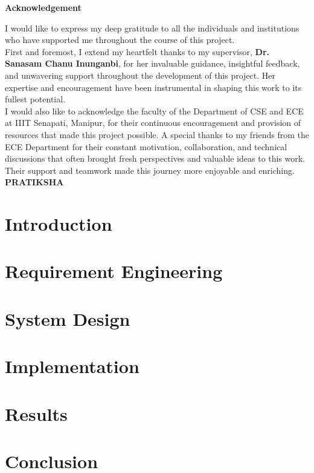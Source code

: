 \documentclass[a4paper,11pt,oneside]{report}
\begin{document}
\pagebreak


\begin{center}
{\LARGE \textbf{Acknowledgement}}
\end{center}

I would like to express my deep gratitude to all the individuals and institutions who have supported me throughout the course of this project.\\

First and foremost, I extend my heartfelt thanks to my supervisor, \textbf{Dr. Sanasam Chanu Inunganbi}, for her invaluable guidance, insightful feedback, and unwavering support throughout the development of this project. Her expertise and encouragement have been instrumental in shaping this work to its fullest potential.\\

I would also like to acknowledge the faculty of the Department of CSE and ECE at IIIT Senapati, Manipur, for their continuous encouragement and provision of resources that made this project possible. A special thanks to my friends from the ECE Department for their constant motivation, collaboration, and technical discussions that often brought fresh perspectives and valuable ideas to this work. Their support and teamwork made this journey more enjoyable and enriching.\\

\hspace{10cm} \textbf{PRATIKSHA}



	\tableofcontents
	\listoffigures
        \listoftables
	\chapter{Introduction}
	

        
        \chapter{Requirement Engineering}
        
        \chapter{System Design}
        
        \chapter{Implementation}
        
        \chapter{Results}
        
        \chapter{Conclusion}
        

  
	
\end{document}
